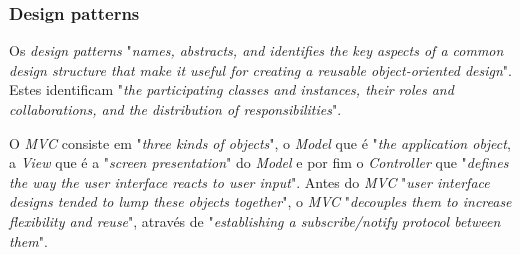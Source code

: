   \subsubsection{Design patterns}
Os \textit{design patterns} "\emph{names, abstracts, and identifies the key aspects of a common design structure that make it useful for creating a reusable object-oriented design}". Estes identificam "\emph{the participating classes and instances, their roles and collaborations, and the distribution of responsibilities}".

O \textit{MVC} consiste em "\emph{three kinds of objects}", o \textit{Model} que é "\emph{the application object}, a \textit{View} que é a "\emph{screen presentation}" do \textit{Model} e por fim o \textit{Controller} que "\emph{defines the way the user interface reacts to user input}". Antes do \textit{MVC} "\emph{user interface designs tended to lump these objects together}", o \textit{MVC} "\emph{decouples them to increase flexibility  and reuse}", através de "\emph{establishing a subscribe/notify  protocol between them}".